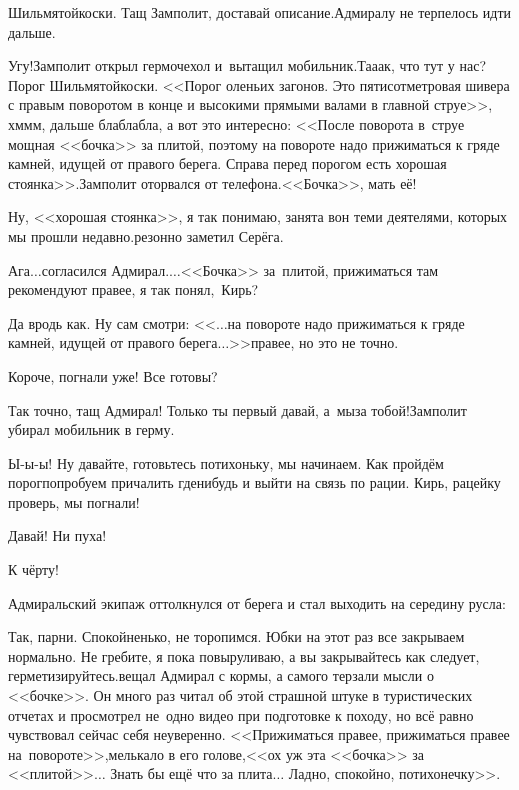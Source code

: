 \diagdash Шильмятойкоски. Тащ Замполит, доставай описание.\mdash Адмиралу не терпелось идти дальше.

\diagdash Угу!\mdash Замполит открыл гермочехол и~вытащил мобильник.\mdash Та\sdash а\sdash ак, что тут у нас? Порог Шильмятойкоски. <<Порог оленьих загонов. Это пятисотметровая шивера с правым поворотом в конце и высокими прямыми валами в главной струе>>, хм\sdash м\sdash м, дальше бла\sdash бла\sdash бла, а вот это интересно: <<После поворота в~струе мощная <<бочка>> за плитой, поэтому на повороте надо прижиматься к гряде камней, идущей от правого берега. Справа перед порогом есть хорошая стоянка>>.\mdash Замполит оторвался от телефона.\mdash <<Бочка>>, мать её!

\diagdash Ну, <<хорошая стоянка>>, я так понимаю, занята вон теми деятелями, которых мы прошли недавно.\mdash резонно заметил Серёга.

\diagdash Ага$\ldots$\mdash согласился Адмирал.\mdash$\ldots$<<Бочка>> за~плитой, прижиматься там рекомендуют правее, я так понял,~Кирь?

\diagdash Да вродь как. Ну сам смотри: <<$\ldots$на повороте надо прижиматься к гряде камней, идущей от правого берега$\ldots$>>\mdash правее, но это не точно.

\diagdash Короче, погнали уже! Все готовы?

\diagdash Так точно, тащ Адмирал! Только ты первый давай, а~мы\mdash за тобой!\mdash Замполит убирал мобильник в герму.

\diagdash Ы-ы-ы! Ну давайте, готовьтесь потихоньку, мы начинаем. Как пройдём порог\mdash попробуем причалить где\sdash нибудь и выйти на связь по рации. Кирь, рацейку проверь, мы погнали!

\diagdash Давай! Ни пуха!

\diagdash К чёрту!

Адмиральский экипаж оттолкнулся от берега и стал выходить на середину русла:

\diagdash Так, парни. Спокойненько, не торопимся. Юбки на этот раз все закрываем нормально. Не гребите, я пока повыруливаю, а вы закрывайтесь как следует, герметизируйтесь.\mdash вещал Адмирал с кормы, а самого терзали мысли о <<бочке>>. Он много раз читал об этой страшной штуке в туристических отчетах и просмотрел не~одно видео при подготовке к походу, но всё равно чувствовал сейчас себя неуверенно. <<Прижиматься правее, прижиматься правее на~повороте>>,\mdash мелькало в его голове,\mdash<<ох уж эта <<бочка>> за <<плитой>>$\ldots$ Знать бы ещё что за плита$\ldots$ Ладно, спокойно, потихонечку>>.

